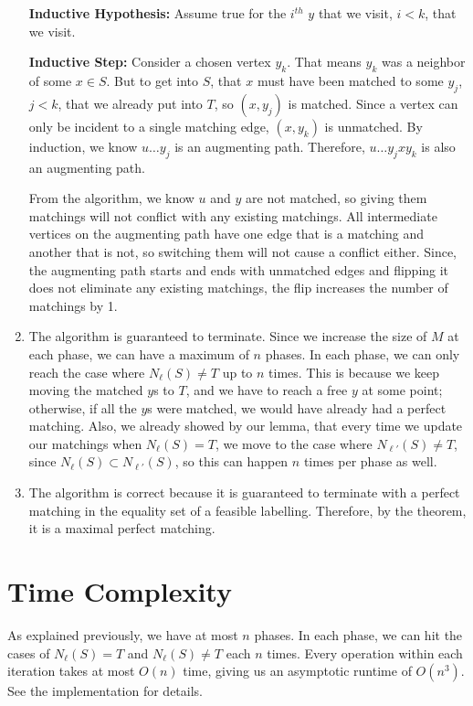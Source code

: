 \documentclass[12pt]{article}
\begin{document}
\begin{enumerate}
  \textbf{Inductive Hypothesis: } Assume true for the $i^{th}$ $y$ that we visit, $i < k$, that we visit.

  \textbf{Inductive Step: } Consider a chosen vertex $y_k$. That means $y_k$ was a neighbor of some $x \in S$. But to get into $S$, that $x$ must have been matched to some $y_j$, $j < k$, that we already put into $T$, so $(x, y_j)$ is matched. Since a vertex can only be incident to a single matching edge, $(x, y_k)$ is unmatched. By induction, we know $u\ldots y_j$ is an augmenting path. Therefore, $u\ldots y_jxy_k$ is also an augmenting path.

  From the algorithm, we know $u$ and $y$ are not matched, so giving them matchings will not conflict with any existing matchings. All intermediate vertices on the augmenting path have one edge that is a matching and another that is not, so switching them will not cause a conflict either. Since, the augmenting path starts and ends with unmatched edges and flipping it does not eliminate any existing matchings, the flip increases the number of matchings by 1.


  \item The algorithm is guaranteed to terminate. Since we increase the size of $M$ at each phase, we can have a maximum of $n$ phases. In each phase, we can only reach the case where $N_\ell(S) \neq T$ up to $n$ times. This is because we keep moving the matched $y$s to $T$, and we have to reach a free $y$ at some point; otherwise, if all the $y$s were matched, we would have already had a perfect matching. Also, we already showed by our lemma, that every time we update our matchings when $N_\ell(S) = T$, we move to the case where $N_{\ell'}(S) \neq T$, since $N_{\ell}(S) \subset N_{\ell'}(S)$, so this can happen $n$ times per phase as well.

\item The algorithm is correct because it is guaranteed to terminate with a perfect matching in the equality set of a feasible labelling. Therefore, by the theorem, it is a maximal perfect matching.
\end{enumerate}


\section*{Time Complexity}

As explained previously, we have at most $n$ phases. In each phase, we can hit the cases of $N_\ell(S) = T$ and $N_\ell(S) \neq T$ each $n$ times. Every operation within each iteration takes at most $O(n)$ time, giving us an asymptotic runtime of $O(n^3)$. See the implementation for details.
\end{document}
